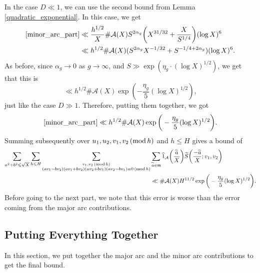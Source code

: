 \documentclass[12pt]{amsart}
\theoremstyle{definition}
\theoremstyle{definition}
\theoremstyle{remark}
\numberwithin{equation}{section}
\newcommand{\CA}{\mathcal{A}}
\newcommand{\m}{\mathfrak{m}}
\renewcommand{\leq}{\leqslant}
\renewcommand{\hat}{\widehat}
\renewcommand{\tilde}{\widetilde}
\renewcommand{\mod}[1]{\,({\rm mod}\,#1)}
\begin{document}
In the case $D\ll 1$, we can use the second bound from Lemma \ref{quadratic_exponential}. In this case, we get
\begin{align*}
\eqref{minor_arc_part} &\ll \frac{h^{1/2}}{X} \#\CA(X) S^{2\alpha_g} \bigg( X^{31/32} + \frac{X}{S^{1/4}}\bigg) (\log X)^6 \\
&\ll h^{1/2} \#\CA(X) (S^{2\alpha_g} X^{-1/32} + S^{-1/4+2\alpha_g})(\log X)^6.
\end{align*}
As before, since $\alpha_g\to 0$ as $g\to\infty$, and $S\gg \exp(\eta_g\cdot (\log X)^{1/2})$, we get that this is 
$$\ll h^{1/2} \#\CA(X) \exp(-\frac{\eta_g}{5} (\log X)^{1/2}) ,$$ 
just like the case $D\gg 1$. Therefore, putting them together, we got
$$ \eqref{minor_arc_part} \ll h^{1/2} \#\CA(X) \exp\bigg(- \frac{\eta_g}{5} (\log X)^{1/2}\bigg) .  $$
Summing subsequently over $u_1,u_2,v_1,v_2 \mod h$ and $h\leq H$ gives a bound of
\begin{align}
\sum_{a^2+b^2\leq \sqrt{X}}\sum_{h\leq H} \sum_{\substack{v_1,v_2 \mod h \\ (av_1 - bv_2)(av_1 + bv_2)(av_2 + b v_1)(av_2 - bv_1) \equiv 0 \mod h}}&\sum_{\substack{\tilde{a}\in \m}} \hat{1}_{\CA} \bigg( \frac{\tilde{a}}{X} \bigg) \tilde{S}\bigg( \frac{-\tilde{a}}{X} ; v_1,v_2 \bigg) \label{minor_arc_contr} \\
&\ll \#\CA(X) H^{11/2} \exp\bigg( -\frac{\eta_g}{5} (\log X)^{1/2} \bigg) . \notag
\end{align}
Before going to the next part, we note that this error is worse than the error coming from the major arc contributions.



\subsection{Putting Everything Together}
In this section, we put together the major arc and the minor arc contributions to get the final bound.
\end{document}
